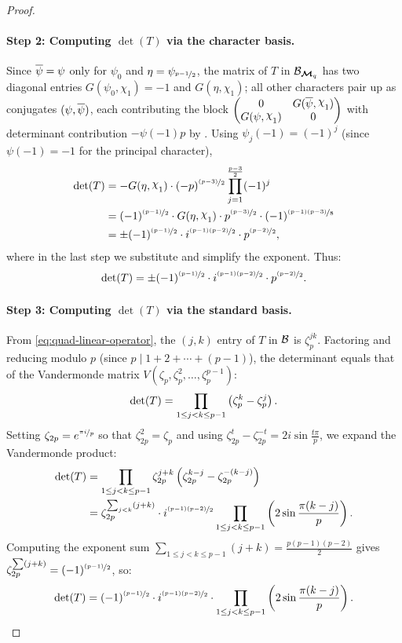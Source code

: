 \begin{proof}
  \paragraph*{Step 2: Computing $\det(T)$ via the character basis.}
  Since $\overline{\psi}=\psi$ only for $\psi_0$ and $\eta=\psi_{\nicefrac{p-1}2}$, the matrix of $T$ in $\mathcal{B}_{\boldsymbol{\mathcal{M}}_q}$ has two diagonal entries $G(\psi_0,\chi_1)=-1$ and $G(\eta,\chi_1)$; all other characters pair up as conjugates $(\psi,\overline{\psi})$, each contributing the block $\begin{pmatrix}0&G(\ov{\psi},\chi_1)\\G(\psi,\chi_1)&0\end{pmatrix}$ with determinant contribution $-\psi(-1)p$ by . Using $\psi_j(-1)=(-1)^j$ (since $\psi(-1)=-1$ for the principal character),
  \begin{align*}
    \det(T) & = - G(\eta,\chi_1) \cdot (-p)^{\nicefrac{(p-3)}2}\prod_{j=1}^{\frac{p-3}2}(-1)^j\\
    & =  (-1)^{\nicefrac{(p-1)}{2}}\cdot G(\eta,\chi_1) \cdot p^{\nicefrac{(p-3)}2}\cdot (-1)^{\nicefrac{(p-1)(p-3)}8}\\
    & = \pm (-1)^{\nicefrac{(p-1)}{2}}\cdot i^{\nicefrac{(p-1)(p-2)}2}\cdot p^{\nicefrac{(p-2)}{2}},
  \end{align*}
  where in the last step we substitute  and simplify the exponent. Thus:
  \begin{equation}\label{eq:fourier-basis-det}
    \det(T)=\pm (-1)^{\nicefrac{(p-1)}{2}}\cdot i^{\nicefrac{(p-1)(p-2)}2}\cdot p^{\nicefrac{(p-2)}{2}}.
  \end{equation}

  \paragraph*{Step 3: Computing $\det(T)$ via the standard basis.}
  From \eqref{eq:quad-linear-operator}, the $(j,k)$ entry of $T$ in $\mathcal{B}$ is $\zeta_p^{jk}$. Factoring and reducing modulo $p$ (since $p\mid 1+2+\cdots+(p-1)$), the determinant equals that of the Vandermonde matrix $V(\zeta_p,\zeta_p^2,\dots,\zeta_p^{p-1})$:
  $$\det(T)=\prod_{1\leq j<k\leq p-1}\left(\zeta_p^k-\zeta_p^j\right).$$
  Setting $\zeta_{2p}=e^{\nicefrac{\pi i}{p}}$ so that $\zeta_{2p}^2=\zeta_p$ and using $\zeta_{2p}^t-\zeta_{2p}^{-t}=2i\sin\frac{t\pi}{p}$, we expand the Vandermonde product:
  \begin{align*}
    \det(T) & = \prod_{1\leq j<k\leq p-1}\zeta_{2p}^{j+k}\left(\zeta_{2p}^{k-j}-\zeta_{2p}^{-(k-j)}\right)\\
    & = \zeta_{2p}^{\sum_{j<k}(j+k)} \cdot i^{\nicefrac{(p-1)(p-2)}{2}}\prod_{1\leq j<k\leq p-1} \left(2\sin\frac{\pi(k-j)}{p}\right).
  \end{align*}
  Computing the exponent sum $\sum_{1\leq j<k\leq p-1}(j+k)=\frac{p(p-1)(p-2)}{2}$ gives $\zeta_{2p}^{\sum(j+k)}=(-1)^{\nicefrac{(p-1)}{2}}$, so:
  \begin{equation}\label{eq:standard-basis-det}
    \det(T)=(-1)^{\nicefrac{(p-1)}{2}}\cdot i^{\nicefrac{(p-1)(p-2)}{2}}\cdot \prod_{1\leq j<k\leq p-1} \left(2\sin\frac{\pi(k-j)}{p}\right).
  \end{equation}


\end{proof}
